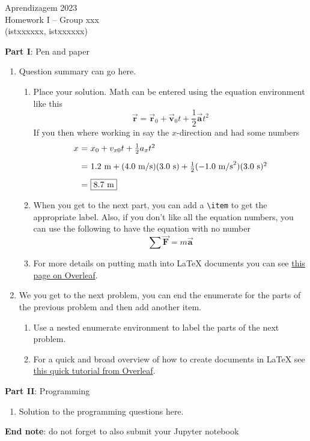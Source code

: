 \documentclass[12pt]{article}
\begin{document}
\center
Aprendizagem 2023\\
Homework I -- Group xxx\\
(istxxxxxx, istxxxxxx)\vskip 1cm

\large{\textbf{Part I}: Pen and paper}\normalsize

\begin{enumerate}[leftmargin=\labelsep]
\item Question summary can go here.
    \begin{enumerate}
    \item Place your solution. Math can be entered using the equation
    environment like this
    \begin{equation}
        \vec{\mathbf{r}} = \vec{\mathbf{r}}_{0} + \vec{\mathbf{v}}_{0}t + \frac{1}{2}\vec{\mathbf{a}}t^{2}
    \end{equation}
    If you then where working in say the $x$-direction and had some numbers %
    \begin{equation}
    \begin{array}{r@{~=~}l}
    x & x_{0} + v_{x0}t + \frac{1}{2}a_{x}t^{2} \\ [2ex]
    & 1.2~\text{m} + (4.0~\text{m/s})(3.0~\text{s}) + \frac{1}{2}(-1.0~\text{m/s}^{2})(3.0~\text{s})^{2}\\ [2ex]
    & \boxed{8.7~\text{m}}
    \end{array}
    \end{equation}

    \item When you get to the next part, you can add a \verb"\item" to get the appropriate label. Also,
    if you don't like all the equation numbers, you can use the following to have the equation with
    no number
    \begin{equation*}
    \sum\vec{\mathbf{F}} = m\vec{\mathbf{a}}
    \end{equation*}

    \item For more details on putting math into {\LaTeX} documents you can see
    \href{https://www.overleaf.com/learn/latex/Mathematical_expressions}{this page on Overleaf}.
    \end{enumerate}

\item We you get to the next problem, you can end the enumerate for the parts of the previous problem and then add another item.
    \begin{enumerate}
    \item Use a nested enumerate environment to label the parts of the next problem.
    \item For a quick and broad overview of how to create documents in {\LaTeX} see
    \href{https://www.overleaf.com/learn/latex/Learn_LaTeX_in_30_minutes}{this quick tutorial from Overleaf}.
    \end{enumerate}
\end{enumerate}

\large{\textbf{Part II}: Programming}\normalsize

\begin{enumerate}[leftmargin=\labelsep,resume]
\item Solution to the programming questions here.
\end{enumerate}

\vskip 1cm
\textbf{End note}: do not forget to also submit your Jupyter notebook
\end{document}
